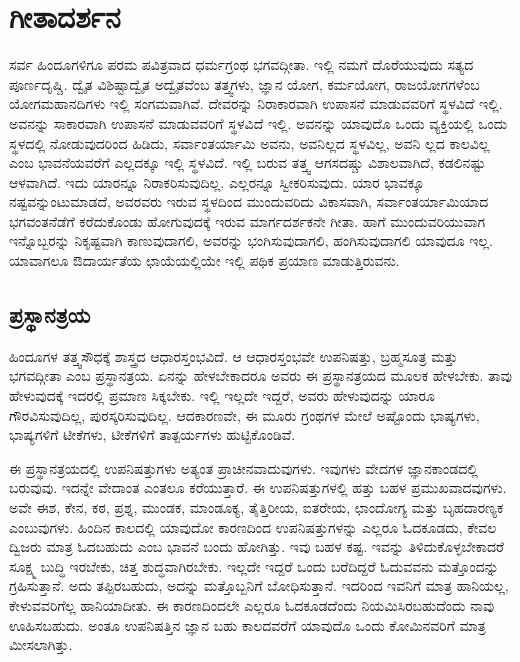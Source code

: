 
\chapter{ಗೀತಾದರ್ಶನ}

ಸರ್ವ ಹಿಂದೂಗಳಿಗೂ ಪರಮ ಪವಿತ್ರವಾದ ಧರ್ಮಗ್ರಂಥ ಭಗವದ್ಗೀತಾ. ಇಲ್ಲಿ ನಮಗೆ ದೊರೆಯುವುದು ಸತ್ಯದ ಪೂರ್ಣದೃಷ್ಚಿ. ದ್ವೈತ ವಿಶಿಷ್ಟಾದ್ವೈತ ಅದ್ವೈತವೆಂಬ ತತ್ತ್ವಗಳು, ಜ್ಞಾನ ಯೋಗ, ಕರ್ಮಯೋಗ, ರಾಜಯೋಗಗಳೆಂಬ ಯೋಗಮಹಾನದಿಗಳು ಇಲ್ಲಿ ಸಂಗಮವಾಗಿವೆ. ದೇವರನ್ನು ನಿರಾಕಾರವಾಗಿ ಉಪಾಸನೆ ಮಾಡುವವರಿಗೆ ಸ್ಥಳವಿದೆ ಇಲ್ಲಿ. ಅವನನ್ನು ಸಾಕಾರವಾಗಿ ಉಪಾಸನೆ ಮಾಡುವವರಿಗೆ ಸ್ಥಳವಿದೆ ಇಲ್ಲಿ. ಅವನನ್ನು ಯಾವುದೊ ಒಂದು ವ್ಯಕ್ತಿಯಲ್ಲಿ ಒಂದು ಸ್ಥಳದಲ್ಲಿ ನೋಡುವುದರಿಂದ ಹಿಡಿದು, ಸರ್ವಾಂತರ್ಯಾಮಿ ಅವನು, ಅವನಿಲ್ಲದ ಸ್ಥಳವಿಲ್ಲ, ಅವನಿ ಲ್ಲದ ಕಾಲವಿಲ್ಲ ಎಂಬ ಭಾವನೆಯವರೆಗೆ ಎಲ್ಲದಕ್ಕೂ ಇಲ್ಲಿ ಸ್ಥಳವಿದೆ. ಇಲ್ಲಿ ಬರುವ ತತ್ತ್ವ ಆಗಸದಷ್ಚು ವಿಶಾಲವಾಗಿದೆ, ಕಡಲಿನಷ್ಟು ಆಳವಾಗಿದೆ. ಇದು ಯಾರನ್ನೂ ನಿರಾಕರಿಸುವುದಿಲ್ಲ. ಎಲ್ಲರನ್ನೂ ಸ್ವೀಕರಿಸುವುದು. ಯಾರ ಭಾವಕ್ಕೂ ನಷ್ಟವನ್ನುಂಟುಮಾಡದೆ, ಅವರವರು ಇರುವ ಸ್ಥಳದಿಂದ ಮುಂದುವರಿದು ವಿಕಾಸವಾಗಿ, ಸರ್ವಾಂತರ್ಯಾಮಿಯಾದ ಭಗವಂತನೆಡೆಗೆ ಕರೆದುಕೊಂಡು ಹೋಗುವುದಕ್ಕೆ ಇರುವ ಮಾರ್ಗದರ್ಶಕನೇ ಗೀತಾ. ಹಾಗೆ ಮುಂದುವರಿಯುವಾಗ ಇನ್ನೊಬ್ಬರನ್ನು ನಿಕೃಷ್ಟವಾಗಿ ಕಾಣುವುದಾಗಲಿ, ಅವರನ್ನು ಭಂಗಿಸುವುದಾಗಲಿ, ಹಂಗಿಸುವುದಾಗಲಿ ಯಾವುದೂ ಇಲ್ಲ. ಯಾವಾಗಲೂ ಔದಾರ್ಯತೆಯ ಛಾಯೆಯಲ್ಲಿಯೇ ಇಲ್ಲಿ ಪಥಿಕ ಪ್ರಯಾಣ ಮಾಡುತ್ತಿರುವನು.

\section*{ಪ್ರಸ್ಥಾನತ್ರಯ}

ಹಿಂದೂಗಳ ತತ್ತ್ವಸೌಧಕ್ಕೆ ಶಾಸ್ತ್ರದ ಆಧಾರಸ್ತಂಭವಿದೆ. ಆ ಆಧಾರಸ್ತಂಭವೇ ಉಪನಿಷತ್ತು, ಬ್ರಹ್ಮಸೂತ್ರ ಮತ್ತು ಭಗವದ್ಗೀತಾ ಎಂಬ ಪ್ರಸ್ಥಾನತ್ರಯ. ಏನನ್ನು ಹೇಳಬೇಕಾದರೂ ಅವರು ಈ ಪ್ರಸ್ಥಾನತ್ರಯದ ಮೂಲಕ ಹೇಳಬೇಕು. ತಾವು ಹೇಳುವುದಕ್ಕೆ ಇದರಲ್ಲಿ ಪ್ರಮಾಣ ಸಿಕ್ಕಬೇಕು. ಇಲ್ಲಿ ಇಲ್ಲದೇ ಇದ್ದರೆ, ಅವರು ಹೇಳುವುದನ್ನು ಯಾರೂ ಗೌರವಿಸುವುದಿಲ್ಲ, ಪುರಸ್ಕರಿಸುವುದಿಲ್ಲ. ಆದಕಾರಣವೇ, ಈ ಮೂರು ಗ್ರಂಥಗಳ ಮೇಲೆ ಅಷ್ಟೊಂದು ಭಾಷ್ಯಗಳು, ಭಾಷ್ಯಗಳಿಗೆ ಟೀಕೆಗಳು, ಟೀಕೆಗಳಿಗೆ ತಾತ್ಪರ್ಯಗಳು ಹುಟ್ಟಿಕೊಂಡಿವೆ.

ಈ ಪ್ರಸ್ಥಾನತ್ರಯದಲ್ಲಿ ಉಪನಿಷತ್ತುಗಳು ಅತ್ಯಂತ ಪ್ರಾಚೀನವಾದುವುಗಳು. ಇವುಗಳು ವೇದಗಳ ಜ್ಞಾನಕಾಂಡದಲ್ಲಿ ಬರುವುವು. ಇದನ್ನೇ ವೇದಾಂತ ಎಂತಲೂ ಕರೆಯುತ್ತಾರೆ. ಈ ಉಪನಿಷತ್ತುಗಳಲ್ಲಿ ಹತ್ತು ಬಹಳ ಪ್ರಮುಖವಾದವುಗಳು. ಅವೇ ಈಶ, ಕೇನ, ಕಠ, ಪ್ರಶ್ನ, ಮುಂಡಕ, ಮಾಂಡೂಕ್ಯ, ತೈತ್ತಿರೀಯ, ಐತರೇಯ, ಛಾಂದೋಗ್ಯ ಮತ್ತು ಬೃಹದಾರಣ್ಯಕ ಎಂಬುವುಗಳು. ಹಿಂದಿನ ಕಾಲದಲ್ಲಿ ಯಾವುದೋ ಕಾರಣದಿಂದ ಉಪನಿಷತ್ತುಗಳನ್ನು ಎಲ್ಲರೂ ಓದಕೂಡದು, ಕೇವಲ ದ್ವಿಜರು ಮಾತ್ರ ಓದಬಹುದು ಎಂಬ ಭಾವನೆ ಬಂದು ಹೋಗಿತ್ತು. ಇವು ಬಹಳ ಕಷ್ಟ. ಇವನ್ನು ತಿಳಿದುಕೊಳ್ಳಬೇಕಾದರೆ ಸೂಕ್ಷ್ಮ ಬುದ್ಧಿ ಇರಬೇಕು, ಚಿತ್ತ ಶುದ್ಧವಾಗಿರಬೇಕು. ಇಲ್ಲದೇ ಇದ್ದರೆ ಒಂದು ಬರೆದಿದ್ದರೆ ಓದುವವನು ಮತ್ತೊಂದನ್ನು ಗ್ರಹಿಸುತ್ತಾನೆ. ಅದು ತಪ್ಪಿರಬಹುದು, ಅದನ್ನು ಮತ್ತೊಬ್ಬನಿಗೆ ಬೋಧಿಸುತ್ತಾನೆ. ಇದರಿಂದ ಇವನಿಗೆ ಮಾತ್ರ ಹಾನಿಯಲ್ಲ, ಕೇಳುವವರಿಗೆಲ್ಲ ಹಾನಿಯಾದೀತು. ಈ ಕಾರಣದಿಂದಲೇ ಎಲ್ಲರೂ ಓದಕೂಡದೆಂದು ನಿಯಮಿಸಿರಬಹುದೆಂದು ನಾವು ಊಹಿಸಬಹುದು. ಅಂತೂ ಉಪನಿಷತ್ತಿನ ಜ್ಞಾನ ಬಹು ಕಾಲದವರೆಗೆ ಯಾವುದೊ ಒಂದು ಕೋಮಿನವರಿಗೆ ಮಾತ್ರ ಮೀಸಲಾಗಿತ್ತು.

